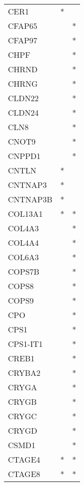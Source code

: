 \begin{longtable}{lcc}
CER1           &         * &         \\
CFAP65         &           &       * \\
CFAP97         &           &       * \\
CHPF           &           &       * \\
CHRND          &           &       * \\
CHRNG          &           &       * \\
CLDN22         &           &       * \\
CLDN24         &           &       * \\
CLN8           &           &       * \\
CNOT9          &           &       * \\
CNPPD1         &           &       * \\
CNTLN          &         * &         \\
CNTNAP3        &         * &         \\
CNTNAP3B       &         * &         \\
COL13A1        &         * &       * \\
COL4A3         &           &       * \\
COL4A4         &           &       * \\
COL6A3         &           &       * \\
COPS7B         &           &       * \\
COPS8          &           &       * \\
COPS9          &           &       * \\
CPO            &           &       * \\
CPS1           &           &       * \\
CPS1-IT1       &           &       * \\
CREB1          &           &       * \\
CRYBA2         &           &       * \\
CRYGA          &           &       * \\
CRYGB          &           &       * \\
CRYGC          &           &       * \\
CRYGD          &           &       * \\
CSMD1          &           &       * \\
CTAGE4         &         * &       * \\
CTAGE8         &         * &       * \\

\end{longtable}
